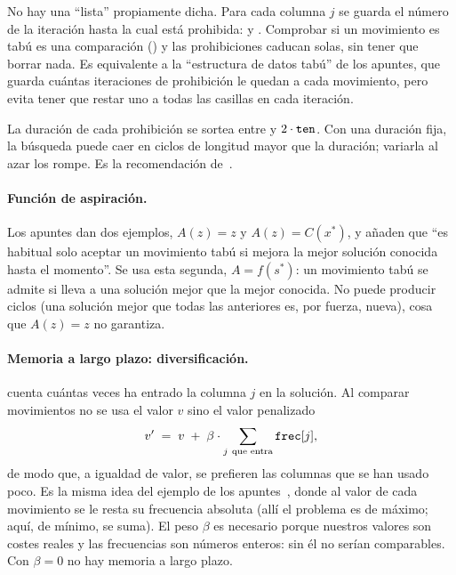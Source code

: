 \begin{decision}
No hay una ``lista'' propiamente dicha. Para cada columna $j$ se guarda el número de la
iteración hasta la cual está prohibida:  y . Comprobar si
un movimiento es tabú es una comparación () y las prohibiciones
caducan solas, sin tener que borrar nada. Es equivalente a la ``estructura de datos tabú'' de
los apuntes, que guarda cuántas iteraciones de prohibición le quedan a cada movimiento, pero
evita tener que restar uno a todas las casillas en cada iteración.
\end{decision}

\begin{decision}
La duración de cada prohibición se sortea entre  y $2\cdot\texttt{ten}$. Con una
duración fija, la búsqueda puede caer en ciclos de longitud mayor que la duración; variarla
al azar los rompe. Es la recomendación de~\cite[sec.~3.2.3]{glover}.
\end{decision}

\paragraph{Función de aspiración.} Los apuntes dan dos ejemplos, $A(z)=z$ y
$A(z)=C(x^\ast)$, y añaden que ``es habitual solo aceptar un movimiento tabú si mejora la
mejor solución conocida hasta el momento''. Se usa esta segunda, $A=f(s^\ast)$: un
movimiento tabú se admite si lleva a una solución mejor que la mejor conocida. No puede
producir ciclos (una solución mejor que todas las anteriores es, por fuerza, nueva), cosa que
$A(z)=z$ no garantiza.

\paragraph{Memoria a largo plazo: diversificación.}  cuenta cuántas veces ha
entrado la columna $j$ en la solución. Al comparar movimientos no se usa el valor $v$ sino el
valor penalizado
\[
   v' \;=\; v \;+\; \beta\cdot\sum_{j\ \text{que entra}} \texttt{frec}[j] ,
\]
de modo que, a igualdad de valor, se prefieren las columnas que se han usado poco. Es la
misma idea del ejemplo de los apuntes~\cite{yanez}, donde al valor de cada movimiento se le
resta su frecuencia absoluta (allí el problema es de máximo; aquí, de mínimo, se suma). El
peso $\beta$ es necesario porque nuestros valores son costes reales y las frecuencias son
números enteros: sin él no serían comparables. Con $\beta=0$ no hay memoria a largo plazo.

